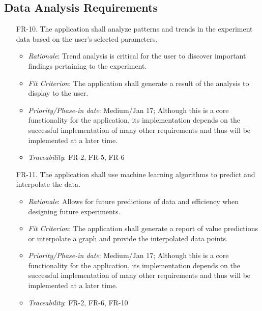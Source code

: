 \documentclass[12pt]{article}
\begin{document}
\subsection{Data Analysis Requirements}
\begin{enumerate}
    \item[FR-10.] The application shall analyze patterns and trends in the experiment data based on the user’s selected parameters.
    \begin{itemize}
      \item \textit{Rationale}: Trend analysis is critical for the user to discover important findings pertaining to the experiment.
      \item \textit{Fit Criterion}: The application shall generate a result of the analysis to display to the user.
      \item \textit{Priority/Phase-in date}: Medium/Jan 17; Although this is a core functionality for the application, its implementation depends on the successful implementation of many other requirements and thus will be implemented at a later time.
      \item \textit{Traceability}: FR-2, FR-5, FR-6
    \end{itemize}
    \item[FR-11.] The application shall use machine learning algorithms to predict and interpolate the data.
    \begin{itemize}
      \item \textit{Rationale}: Allows for future predictions of data and efficiency when designing future experiments.
      \item \textit{Fit Criterion}: The application shall generate a report of value predictions or interpolate a graph and provide the interpolated data points.
      \item \textit{Priority/Phase-in date}: Medium/Jan 17; Although this is a core functionality for the application, its implementation depends on the successful implementation of many other requirements and thus will be implemented at a later time.
      \item \textit{Traceability}: FR-2, FR-6, FR-10
    \end{itemize}
\end{enumerate}
\end{document}
